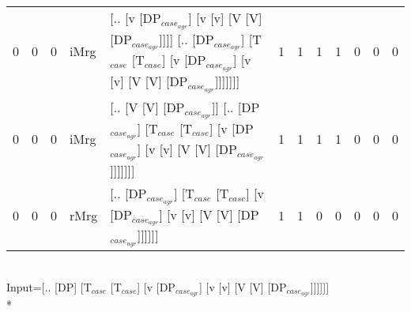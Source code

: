 \begin{tabularx}{\linewidth}{rrrlXrrrrrrr}
   0 &       0 &   0 & iMrg & [.. [v [DP$_{case_{agr}}$] [v [v] [V [V] [DP$_{case_{agr}}$]]]] [.. [DP$_{case_{agr}}$] [T$_{case}$ [T$_{case}$] [v [DP$_{case_{agr}}$] [v [v] [V [V] [DP$_{case_{agr}}$]]]]]]]                   &             1 &             1 &                  1 &            1 &              0 &                0 &              0 \\
   0 &       0 &   0 & iMrg & [.. [V [V] [DP$_{case_{agr}}$]] [.. [DP$_{case_{agr}}$] [T$_{case}$ [T$_{case}$] [v [DP$_{case_{agr}}$] [v [v] [V [V] [DP$_{case_{agr}}$]]]]]]]                                             &             1 &             1 &                  1 &            1 &              0 &                0 &              0 \\
   0 &       0 &   0 & rMrg & [.. [DP$_{case_{agr}}$] [T$_{case}$ [T$_{case}$] [v [DP$_{case_{agr}}$] [v [v] [V [V] [DP$_{case_{agr}}$]]]]]]                                                                        &             1 &             1 &                  0 &            0 &              0 &                0 &              0 \\
\hline
\end{tabularx}\endgroup\\
\begingroup\scriptsize Input=[.. [DP] [T$_{case}$ [T$_{case}$] [v [DP$_{case_{agr}}$] [v [v] [V [V] [DP$_{case_{agr}}$]]]]]]\\*
